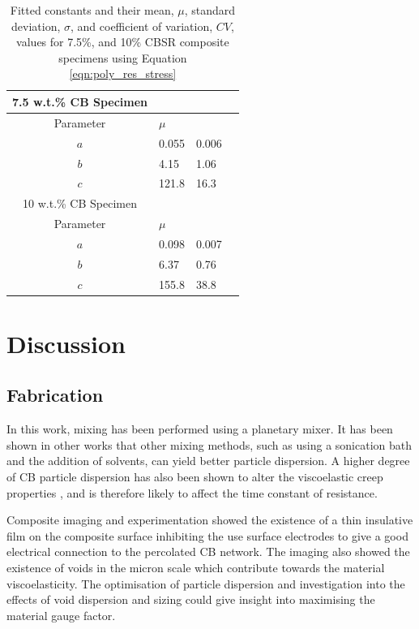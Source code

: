 \begin{table}[H]
	\caption{Fitted constants and their mean, $\mu$, standard deviation, $\sigma$, and coefficient of variation, $CV$, values for 7.5\%, and 10\% CBSR composite specimens using Equation \ref{eqn:poly_res_stress}}
	\begin{center}
		\label{tab:generalised_model_constants}
		\begin{tabular}{c l l l}
			7.5 w.t.\% CB Specimen \\
			\hline
			Parameter & $\mu$ \\
			\hline
			$a$ & 0.055 & 0.006 \\
			$b$ & 4.15 & 1.06 \\
			$c$ & 121.8 & 16.3 \\
			\hline
			10 w.t.\% CB Specimen \\
			\hline
			Parameter & $\mu$ \\
			\hline
			$a$ & 0.098 & 0.007 \\
			$b$ & 6.37 & 0.76 \\
			$c$ & 155.8 & 38.8 \\
			\hline
		\end{tabular}
	\end{center}
\end{table}


\section{Discussion}

\subsection{Fabrication}
In this work, mixing has been performed using a planetary mixer. It has been shown in other works \cite{Xu2016,Spahr2017} that other mixing methods, such as using a sonication bath and the addition of solvents, can yield better particle dispersion. A higher degree of CB particle dispersion has also been shown to alter the viscoelastic creep properties \cite{Xu2016}, and is therefore likely to affect the time constant of resistance.

Composite imaging and experimentation showed the existence of a thin insulative film on the composite surface inhibiting the use surface electrodes to give a good electrical connection to the percolated CB network. The imaging also showed the existence of voids in the micron scale which contribute towards the material viscoelasticity. The optimisation of particle dispersion and investigation into the effects of void dispersion and sizing could give insight into maximising the material gauge factor.

